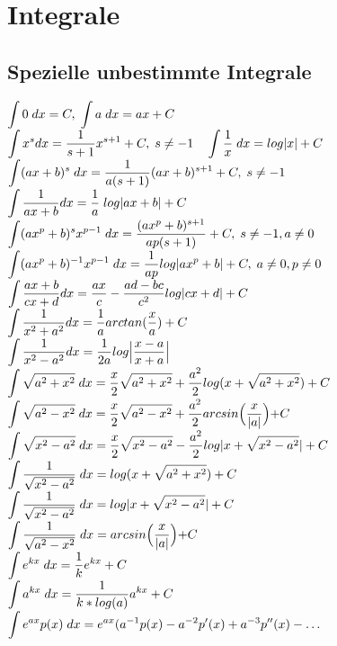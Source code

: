 
\section{Integrale}
\subsection{Spezielle unbestimmte Integrale}
$\mathlarger{\int 0\;dx= C,\; \int a\;dx=ax+C}$\\
$\mathlarger{\int x^sdx=\frac{1}{s+1}x^{s+1}+C,\;s\neq -1\quad \int \frac{1}{x}\;dx = log|x|+C}$\\
$\mathlarger{\int (ax+b)^s\;dx= \frac{1}{a(s+1)}(ax+b)^{s+1} + C,\;s\neq -1}$\\
$\mathlarger{\int \frac{1}{ax+b}dx=\frac{1}{a}\;log|ax+b|+C}$\\
$\mathlarger{\int (ax^p+b)^sx^{p-1}\;dx = \frac{(ax^p+b)^{s+1}}{ap(s+1)}+C,\;s\neq -1, a \neq 0}$\\
$\mathlarger{\int (ax^p+b)^{-1}x^{p-1}\;dx=\frac{1}{ap}log|ax^p+b|+C,\;a\neq 0,p\neq 0}$\\
$\mathlarger{\int \frac{ax+b}{cx+d}dx=\frac{ax}{c}- \frac{ad-bc}{c^2} log|cx+d|+C}$\\
$\mathlarger{\int \frac{1}{x^2+a^2}dx=\frac{1}{a}arctan(\frac{x}{a})+C}$\\
$\mathlarger{\int \frac{1}{x^2-a^2}dx=\frac{1}{2a}log\Bigl|\frac{x-a}{x+a}\Bigl|}$\\
$\mathlarger{\int \sqrt{a^2+x^2}\;dx=\frac{x}{2}\sqrt{a^2+x^2}+\frac{a^2}{2} log(x+\sqrt{a^2+x^2})+C}$\\
$\mathlarger{\int \sqrt{a^2-x^2}\;dx= \frac{x}{2}\sqrt{a^2-x^2}+\frac{a^2}{2}arcsin\Bigl(\frac{x}{|a|}\Bigl)+C}$\\
$\mathlarger{\int \sqrt{x^2-a^2}\;dx= \frac{x}{2}\sqrt{x^2-a^2}-\frac{a^2}{2}log|x+\sqrt{x^2-a^2}|+C}$\\
$\mathlarger{\int \frac{1}{\sqrt{x^2-a^2}}\;dx=log(x+\sqrt{a^2+x^2})+C}$\\
$\mathlarger{\int \frac{1}{\sqrt{x^2-a^2}}\;dx=log|x+\sqrt{x^2-a^2}|+C}$\\
$\mathlarger{\int \frac{1}{\sqrt{a^2-x^2}}\;dx=arcsin\Bigl(\frac{x}{|a|}\Bigl)+C}$\\
$\mathlarger{\int e^{kx}\;dx=\frac{1}{k}e^{kx}+C}$\\
$\mathlarger{\int a^{kx}\;dx=\frac{1}{k*log(a)}a^{kx}+C}$\\
$\mathlarger{\int e^{ax}p(x)\;dx=e^{ax}(a^{-1}p(x)-a^{-2}p'(x)+a^{-3}p''(x)-\dots}$\\
